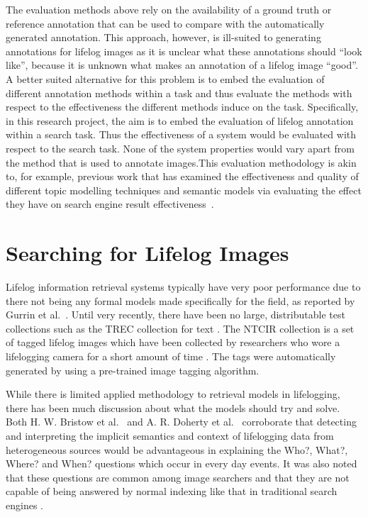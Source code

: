 \documentclass[12pt,a4paper]{article}
\begin{document}
The evaluation methods above rely on the availability of a ground truth or reference annotation that can be used to compare with the automatically generated annotation. This approach, however, is ill-suited to generating annotations for lifelog images as it is unclear what these annotations should ``look like'', because it is unknown what makes an annotation of a lifelog image ``good''. A better suited alternative for this problem is to embed the evaluation of different annotation methods within a task and thus evaluate the  methods with respect to the effectiveness the different methods induce on the task. Specifically, in this research project, the aim is to embed the evaluation of lifelog annotation within a search task. Thus the effectiveness of a system would be evaluated with respect to the search task. None of the system properties would vary apart from the method that is used to annotate images.This evaluation methodology is akin to, for example, previous work that has examined the effectiveness and quality of different topic modelling techniques and semantic models via evaluating the effect they have on search engine result effectiveness~\cite{wei2006lda,zuccon2015integrating,karimzadehgan2010estimation,yi2009comparative}.

\section{Searching for Lifelog Images}
Lifelog information retrieval systems typically have very poor performance due to there not being any formal models made specifically for the field, as reported by Gurrin et al.~\citep{gurrin2014lifelogging}. Until very recently, there have been no large, distributable test collections such as the TREC collection for text \citep{gurrin2014lifelogging}. The NTCIR collection is a set of tagged lifelog images which have been collected by researchers who wore a lifelogging camera for a short amount of time \citep{gurrin2016ntcir}. The tags were automatically generated by using a pre-trained image tagging algorithm.

While there is limited applied methodology to retrieval models in lifelogging, there has been much discussion about what the models should try and solve. Both H.  W.  Bristow et al.~\citep{bristow2004defining} and A. R. Doherty et al.~\cite{doherty2010automatically} corroborate that detecting and interpreting the implicit semantics and context of lifelogging data from heterogeneous sources would be advantageous in explaining the Who?, What?, Where? and When? questions which occur in every day events. It was also noted that these questions are common among image searchers and that they are not capable of being answered by normal indexing like that in traditional search engines \citep{ali2010semantically}.
\end{document}
